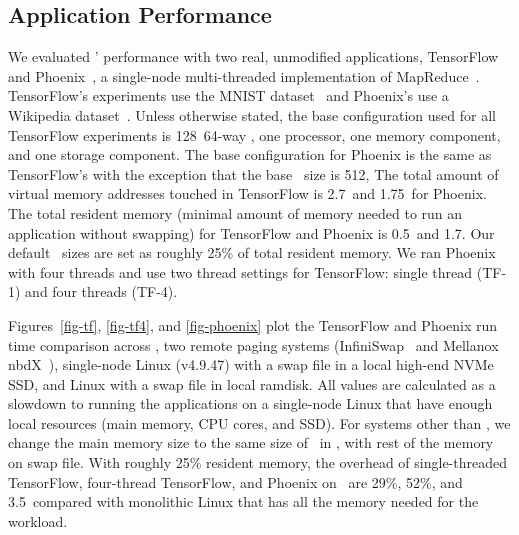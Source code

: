 \documentclass[10pt,times,twocolumn]{z2-article}
\begin{document}
{{{{{{{

\subsection{Application Performance}
\label{sec:appresults}
We evaluated \lego{}' performance with two real, unmodified applications, 
TensorFlow~\cite{TensorFlow} and Phoenix~\cite{Ranger07-HPCA}, a single-node multi-threaded implementation of MapReduce~\cite{DeanEtAl04-MapReduce}.
TensorFlow's experiments use the MNIST dataset~\cite{MNIST-DS} and Phoenix's use a Wikipedia dataset~\cite{Wiki-DS}.
Unless otherwise stated, the base configuration used for all TensorFlow experiments
is 128\MB\ 64-way \excache, one processor, one memory component, and one storage component.
The base configuration for Phoenix is the same as TensorFlow's with the exception that the base \excache\ size is 512\MB,
The total amount of virtual memory addresses touched in TensorFlow is 2.7\GB\ and 1.75\GB\ for Phoenix.
The total resident memory (minimal amount of memory needed to run an application without swapping) 
for TensorFlow and Phoenix is 0.5\GB\ and 1.7\GB.
Our default \excache\ sizes are set as roughly 25\% of total resident memory.
We ran Phoenix with four threads and use two thread settings for TensorFlow: single thread (TF-1) and four threads (TF-4).

Figures~\ref{fig-tf}, \ref{fig-tf4}, and \ref{fig-phoenix} plot the TensorFlow and Phoenix run time comparison across 
\lego, two remote paging systems (InfiniSwap~\cite{GU17-NSDI} and Mellanox nbdX~\cite{nbdX}), 
single-node Linux (v4.9.47) with a swap file in a local high-end NVMe SSD, and Linux with a swap file in local ramdisk.
All values are calculated as a slowdown to running the applications on a single-node Linux that have enough local resources (main memory, CPU cores, and SSD).
For systems other than \lego, we change the main memory size to the same size of \excache\ in \lego, with rest of the memory on swap file. 
With roughly 25\% resident memory, the overhead of single-threaded TensorFlow, four-thread TensorFlow, and Phoenix on \lego\ are 
29\%, 52\%, and 3.5\x\ compared with monolithic Linux that has all the memory needed for the workload.

}}}}}}}
\end{document}
